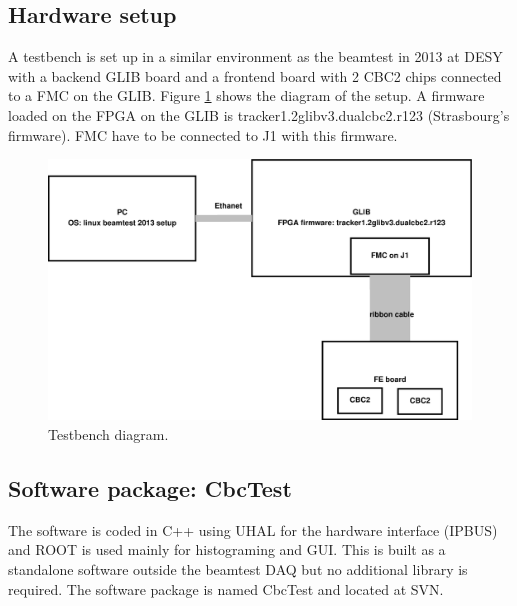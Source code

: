 \documentclass[11pt,a4paper]{article}
\begin{document}
	\subsection{Hardware setup}
	A testbench is set up in a similar environment as the beamtest in 2013 at DESY with a backend GLIB\cite{GLIB} board and a frontend board with 2 CBC2 chips connected to a FMC on the GLIB.
	Figure \ref{fig:testbench} shows the diagram of the setup.  A firmware loaded on the FPGA on the GLIB is tracker1.2glibv3.dualcbc2.r123 (Strasbourg's firmware)\cite{FIRMWARE}.  FMC have to be connected to J1 with this firmware.

	\begin{figure}[htbp]
	\centering
	\includegraphics[width=\textwidth]{fig/TestBench.eps}
	\caption{Testbench diagram. }\label{fig:testbench}
	\end{figure}

	\subsection{Software package: CbcTest}
	The software is coded in C++ using UHAL\cite{UHAL} for the hardware interface (IPBUS) and ROOT\cite{ROOT} is used mainly for histograming and GUI. 
	This is built as a standalone software outside the beamtest DAQ but no additional library is required. The software package is named CbcTest and located at SVN\cite{CBCTEST}. 
\end{document}
